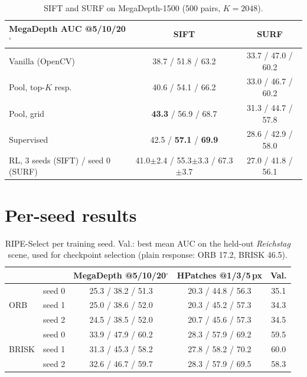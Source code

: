 \documentclass[10pt,twocolumn,letterpaper]{article}
\newcommand{\best}[1]{\textbf{#1}}
\newcommand{\std}[1]{{\scriptsize$\pm$#1}}
\begin{document}
\begin{table}[h]
  \centering\small
  \setlength\tabcolsep{4pt}
  \begin{tabular}{lcc}
    \toprule
    MegaDepth AUC @5/10/20$^\circ$ & SIFT & SURF \\
    \midrule
    Vanilla (OpenCV)  & 38.7 / 51.8 / 63.2 & 33.7 / 47.0 / 60.2 \\
    Pool, top-$K$ resp. & 40.6 / 54.1 / 66.2 & 33.0 / 46.7 / 60.2 \\
    Pool, grid        & \best{43.3} / 56.9 / 68.7 & 31.3 / 44.7 / 57.8 \\
    Supervised        & 42.5 / \best{57.1} / \best{69.9} & 28.6 / 42.9 / 58.0 \\
    RL, 3 seeds (SIFT) / seed 0 (SURF) & 41.0\std{2.4} / 55.3\std{3.3} / 67.3\std{3.7} & 27.0 / 41.8 / 56.1 \\
    \bottomrule
  \end{tabular}
  \caption{SIFT and SURF on MegaDepth-1500 (500 pairs, $K=2048$).}
  \label{tab:siftsurf}
\end{table}

\section{Per-seed results}
\label{app:seeds}
\begin{table}[h]
  \centering\small
  \setlength\tabcolsep{3.5pt}
  \begin{tabular}{llccc}
    \toprule
    & & MegaDepth @5/10/20$^\circ$ & HPatches @1/3/5\,px & Val. \\
    \midrule
    \multirow{3}{*}{ORB}   & seed 0 & 25.3 / 38.2 / 51.3 & 20.3 / 44.8 / 56.3 & 35.1 \\
                           & seed 1 & 25.0 / 38.6 / 52.0 & 20.3 / 45.2 / 57.3 & 34.3 \\
                           & seed 2 & 24.5 / 38.5 / 52.0 & 20.7 / 45.6 / 57.3 & 34.5 \\
    \midrule
    \multirow{3}{*}{BRISK} & seed 0 & 33.9 / 47.9 / 60.2 & 28.3 / 57.9 / 69.2 & 59.5 \\
                           & seed 1 & 31.3 / 45.3 / 58.2 & 27.8 / 58.2 / 70.2 & 60.0 \\
                           & seed 2 & 32.6 / 46.7 / 59.7 & 28.3 / 57.9 / 69.5 & 58.3 \\
    \bottomrule
  \end{tabular}
  \caption{RIPE-Select per training seed. Val.: best mean AUC on the held-out \emph{Reichstag} scene,
  used for checkpoint selection (plain response: ORB 17.2, BRISK 46.5).}
  \label{tab:seeds}
\end{table}
\end{document}
